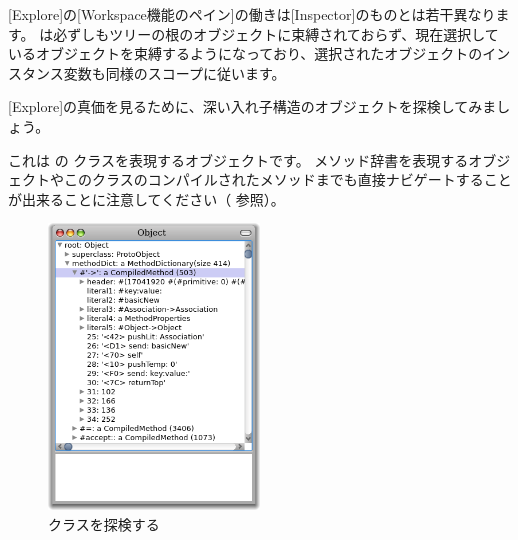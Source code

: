 \documentclass[a4paper,10pt,twoside]{book}
\begin{document}
[Explore]の[Workspace機能のペイン]の働きは[Inspector]のものとは若干異なります。
 は必ずしもツリーの根のオブジェクトに束縛されておらず、現在選択しているオブジェクトを束縛するようになっており、選択されたオブジェクトのインスタンス変数も同様のスコープに従います。

[Explore]の真価を見るために、深い入れ子構造のオブジェクトを探検してみましょう。

これは \pharo の  クラスを表現するオブジェクトです。
メソッド辞書を表現するオブジェクトやこのクラスのコンパイルされたメソッドまでも直接ナビゲートすることが出来ることに注意してください（  参照）。

\begin{figure}[tbp]
	\begin{center}
		\includegraphics[width=0.5\textwidth]{ExploreObject}
	\end{center}
	\caption{ クラスを探検する}
\end{figure}

%
\end{document}
